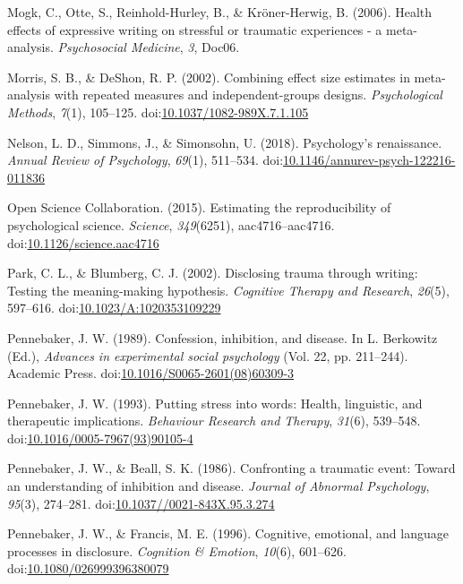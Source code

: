 \documentclass[english,man]{apa6}
\theoremstyle{definition}
\theoremstyle{definition}
\theoremstyle{definition}
\theoremstyle{remark}
\begin{document}
\hypertarget{ref-Mogk2006}{}
Mogk, C., Otte, S., Reinhold-Hurley, B., \& Kröner-Herwig, B. (2006).
Health effects of expressive writing on stressful or traumatic
experiences - a meta-analysis. \emph{Psychosocial Medicine}, \emph{3},
Doc06.

\hypertarget{ref-Morris2002}{}
Morris, S. B., \& DeShon, R. P. (2002). Combining effect size estimates
in meta-analysis with repeated measures and independent-groups designs.
\emph{Psychological Methods}, \emph{7}(1), 105--125.
doi:\href{https://doi.org/10.1037/1082-989X.7.1.105}{10.1037/1082-989X.7.1.105}

\hypertarget{ref-Nelson2018}{}
Nelson, L. D., Simmons, J., \& Simonsohn, U. (2018). Psychology's
renaissance. \emph{Annual Review of Psychology}, \emph{69}(1), 511--534.
doi:\href{https://doi.org/10.1146/annurev-psych-122216-011836}{10.1146/annurev-psych-122216-011836}

\hypertarget{ref-OpenScienceCollaboration2015}{}
Open Science Collaboration. (2015). Estimating the reproducibility of
psychological science. \emph{Science}, \emph{349}(6251),
aac4716--aac4716.
doi:\href{https://doi.org/10.1126/science.aac4716}{10.1126/science.aac4716}

\hypertarget{ref-Park2002}{}
Park, C. L., \& Blumberg, C. J. (2002). Disclosing trauma through
writing: Testing the meaning-making hypothesis. \emph{Cognitive Therapy
and Research}, \emph{26}(5), 597--616.
doi:\href{https://doi.org/10.1023/A:1020353109229}{10.1023/A:1020353109229}

\hypertarget{ref-Pennebaker1989}{}
Pennebaker, J. W. (1989). Confession, inhibition, and disease. In L.
Berkowitz (Ed.), \emph{Advances in experimental social psychology} (Vol.
22, pp. 211--244). Academic Press.
doi:\href{https://doi.org/10.1016/S0065-2601(08)60309-3}{10.1016/S0065-2601(08)60309-3}

\hypertarget{ref-Pennebaker1993}{}
Pennebaker, J. W. (1993). Putting stress into words: Health, linguistic,
and therapeutic implications. \emph{Behaviour Research and Therapy},
\emph{31}(6), 539--548.
doi:\href{https://doi.org/10.1016/0005-7967(93)90105-4}{10.1016/0005-7967(93)90105-4}

\hypertarget{ref-Pennebaker1986}{}
Pennebaker, J. W., \& Beall, S. K. (1986). Confronting a traumatic
event: Toward an understanding of inhibition and disease. \emph{Journal
of Abnormal Psychology}, \emph{95}(3), 274--281.
doi:\href{https://doi.org/10.1037//0021-843X.95.3.274}{10.1037//0021-843X.95.3.274}

\hypertarget{ref-Pennebaker1996}{}
Pennebaker, J. W., \& Francis, M. E. (1996). Cognitive, emotional, and
language processes in disclosure. \emph{Cognition \& Emotion},
\emph{10}(6), 601--626.
doi:\href{https://doi.org/10.1080/026999396380079}{10.1080/026999396380079}
\end{document}
